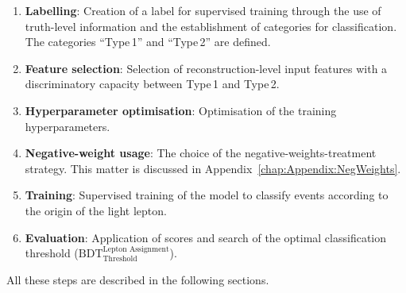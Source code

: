 \begin{enumerate}
	\item \textbf{Labelling}: Creation of a label for supervised training through the use of truth-level 
		information and the establishment of categories for classification. 
		The categories ``Type$\,$1'' and ``Type$\,$2'' are defined.
		
	\item \textbf{Feature selection}: Selection of reconstruction-level 
		input features with a discriminatory capacity between Type$\,$1 
		and Type$\,$2. %
		
	\item \textbf{Hyperparameter optimisation}: Optimisation of the training 
		hyperparameters. %
	
	\item \textbf{Negative-weight usage}: The choice of the negative-weights-treatment strategy. 
		This matter is discussed in Appendix~\ref{chap:Appendix:NegWeights}.
		 
	
	\item \textbf{Training}: Supervised training of the model to classify events according
		to the origin of the light lepton. %

	\item \textbf{Evaluation}: Application of scores and search 
		of the optimal classification threshold ($\text{BDT}_{\text{Threshold}}^{\text{Lepton Assignment}}$). 
\end{enumerate}
All these steps are described in the following sections.

